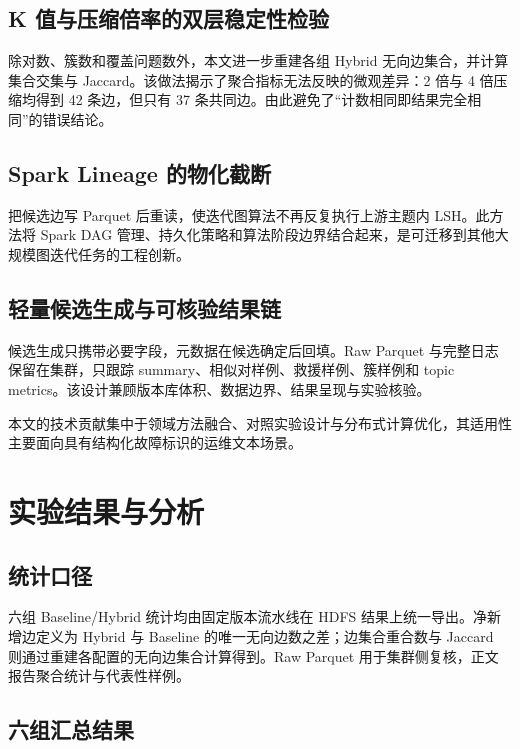 \documentclass[a4paper,UTF8,zihao=5,fontset=windows]{ctexart}
\begin{document}
\subsection{K 值与压缩倍率的双层稳定性检验}

除对数、簇数和覆盖问题数外，本文进一步重建各组 Hybrid 无向边集合，并计算集合交集与 Jaccard。该做法揭示了聚合指标无法反映的微观差异：2 倍与 4 倍压缩均得到 42 条边，但只有 37 条共同边。由此避免了“计数相同即结果完全相同”的错误结论。

\subsection{Spark Lineage 的物化截断}

把候选边写 Parquet 后重读，使迭代图算法不再反复执行上游主题内 LSH。此方法将 Spark DAG 管理、持久化策略和算法阶段边界结合起来，是可迁移到其他大规模图迭代任务的工程创新。

\subsection{轻量候选生成与可核验结果链}

候选生成只携带必要字段，元数据在候选确定后回填。Raw Parquet 与完整日志保留在集群，只跟踪 summary、相似对样例、救援样例、簇样例和 topic metrics。该设计兼顾版本库体积、数据边界、结果呈现与实验核验。

本文的技术贡献集中于领域方法融合、对照实验设计与分布式计算优化，其适用性主要面向具有结构化故障标识的运维文本场景。

\section{实验结果与分析}

\subsection{统计口径}

六组 Baseline/Hybrid 统计均由固定版本流水线在 HDFS 结果上统一导出。净新增边定义为 Hybrid 与 Baseline 的唯一无向边数之差；边集合重合数与 Jaccard 则通过重建各配置的无向边集合计算得到。Raw Parquet 用于集群侧复核，正文报告聚合统计与代表性样例。

\subsection{六组汇总结果}
\end{document}
